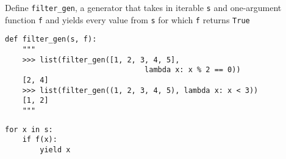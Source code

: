 \begin{blocksection}
\question Define \lstinline$filter_gen$, a generator that takes in iterable \lstinline$s$ and one-argument function  \lstinline$f$ and yields every value
from  \lstinline$s$ for which \lstinline$f$ returns  \lstinline$True$

\begin{lstlisting}
def filter_gen(s, f):
    """
    >>> list(filter_gen([1, 2, 3, 4, 5],
                                lambda x: x % 2 == 0))
    [2, 4]
    >>> list(filter_gen((1, 2, 3, 4, 5), lambda x: x < 3))
    [1, 2]
    """
\end{lstlisting}

\begin{solution}[1.5in]
\begin{lstlisting}
for x in s:
    if f(x):
        yield x
\end{lstlisting}
\end{solution}
\end{blocksection}
